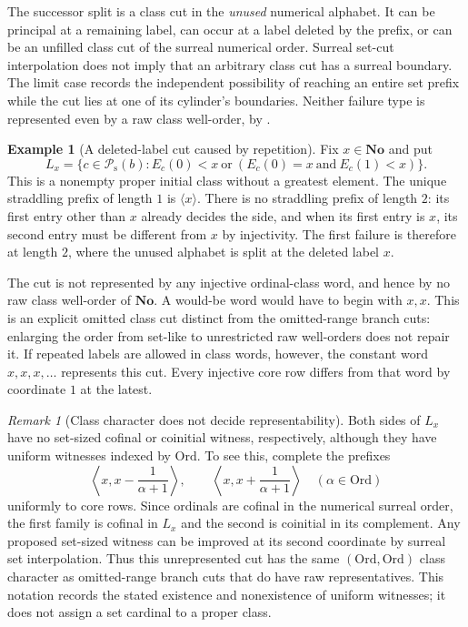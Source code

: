 \documentclass[11pt]{article}
\theoremstyle{definition}
\newtheorem{example}[example]{Example}
\theoremstyle{remark}
\newtheorem{remark}[remark]{Remark}
\newcommand{\No}{\mathbf{No}}
\newcommand{\Ord}{\mathrm{Ord}}
\newcommand{\Psupp}{\mathcal P_{\mathrm{s}}}
\begin{document}
The successor split is a class cut in the \emph{unused} numerical
alphabet.  It can be principal at a remaining label, can occur at
a label deleted by the prefix, or can be an unfilled class cut of
the surreal numerical order.  Surreal set-cut interpolation does
not imply that an arbitrary class cut has a surreal boundary.
The limit case records the independent possibility of reaching an
entire set prefix while the cut lies at one of its cylinder's
boundaries.  Neither failure type is represented even by a raw
class well-order, by .

\begin{example}[A deleted-label cut caused by repetition]
\label{swo:sh:ex:repeated-label-cut}
Fix $x\in\No$ and put
\[
 L_x=\{c\in\Psupp(b):
 E_c(0)<x\ \text{or}\
 (E_c(0)=x\ \text{and}\ E_c(1)<x)\}.
\]
This is a nonempty proper initial class without a greatest element.
The unique straddling prefix of length $1$ is $\langle x\rangle$.
There is no straddling prefix of length $2$: its first entry other
than $x$ already decides the side, and when its first entry is
$x$, its second entry must be different from $x$ by injectivity.
The first failure is therefore at length $2$, where the unused
alphabet is split at the deleted label $x$.

The cut is not represented by any injective ordinal-class word,
and hence by no raw class well-order of $\No$.  A would-be
word would have to begin with $x,x$.  This is an explicit omitted
class cut distinct from the omitted-range branch cuts: enlarging
the order from set-like to unrestricted raw well-orders does not
repair it.  If repeated labels are allowed in class words, however,
the constant word $x,x,x,\ldots$ represents this cut.  Every injective
core row differs from that word by coordinate $1$ at the latest.
\end{example}

\begin{remark}[Class character does not decide representability]\label{swo:sh:n15.7}
Both sides of $L_x$ have no set-sized cofinal or coinitial witness,
respectively, although they have uniform witnesses indexed by
$\Ord$. To see this, complete the prefixes
\[
 \left\langle x,x-\frac{1}{\alpha+1}\right\rangle,
 \qquad
 \left\langle x,x+\frac{1}{\alpha+1}\right\rangle
 \quad(\alpha\in\Ord)
\]
uniformly to core rows. Since ordinals are cofinal in the numerical
surreal order, the first family is cofinal in $L_x$ and the second
is coinitial in its complement. Any proposed set-sized witness can
be improved at its second coordinate by surreal set interpolation.
Thus this unrepresented cut has the same $(\Ord,\Ord)$
class character as omitted-range branch cuts that do have raw
representatives. This notation records the stated existence and
nonexistence of uniform witnesses; it does not assign a set cardinal
to a proper class.
\end{remark}
\end{document}
